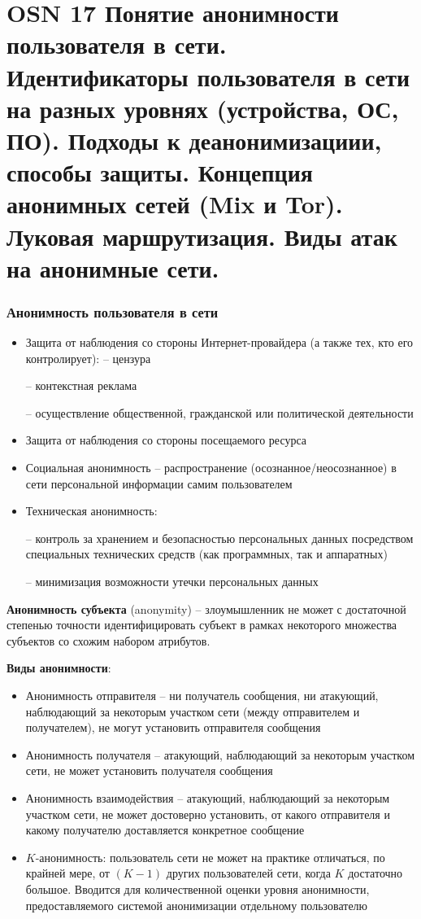 \section*{OSN 17 Понятие анонимности пользователя в сети. Идентификаторы пользователя в сети на разных уровнях (устройства, ОС, ПО). Подходы к деанонимизациии, способы защиты. Концепция анонимных сетей (Mix и Tor). Луковая маршрутизация. Виды атак на анонимные сети.}

\subsubsection{Анонимность пользователя в сети}

\begin{itemize}
    \item Защита от наблюдения со стороны Интернет-провайдера (а также тех, кто его контролирует):
    – цензура
    
    – контекстная реклама
    
    – осуществление общественной, гражданской или политической деятельности
    \item Защита от наблюдения со стороны посещаемого ресурса    
\end{itemize}

\begin{itemize}
    \item Социальная анонимность – распространение (осознанное/неосознанное) в сети
персональной информации самим пользователем
    \item Техническая анонимность:
    
    – контроль за хранением и безопасностью персональных данных посредством специальных технических средств (как программных, так и аппаратных)
    
    – минимизация возможности утечки персональных данных
\end{itemize}

\textbf{Анонимность субъекта} (anonymity) -- злоумышленник не может с достаточной степенью точности идентифицировать субъект в рамках некоторого множества субъектов со схожим
набором атрибутов.

\textbf{Виды анонимности}:
\begin{itemize}
    \item Анонимность отправителя -- ни получатель сообщения, ни атакующий, наблюдающий за некоторым участком сети (между отправителем и получателем), не могут установить отправителя сообщения
    \item Анонимность получателя -- атакующий, наблюдающий за некоторым участком сети, не может установить получателя сообщения
    \item Анонимность взаимодействия -- атакующий, наблюдающий за некоторым участком сети, не может достоверно установить, от какого отправителя и какому получателю доставляется конкретное сообщение
    \item $K$-анонимность: пользователь сети не может на практике отличаться, по крайней мере, от $(K - 1)$ других пользователей сети, когда $K$ достаточно большое. Вводится для количественной оценки уровня анонимности, предоставляемого системой анонимизации отдельному пользователю
\end{itemize}

